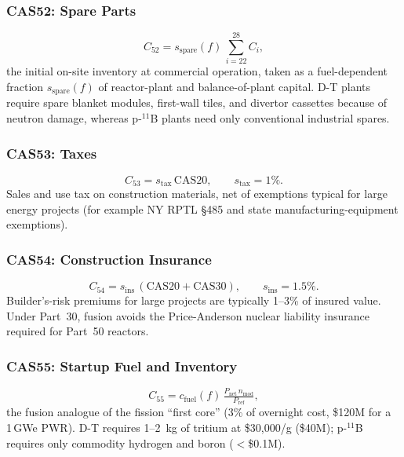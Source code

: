 \documentclass{article}
\begin{document}
\subsubsection{CAS52: Spare Parts}
\begin{equation}
\label{eq:cas52}
C_{52} = s_{\text{spare}}(f)\,\textstyle\sum_{i=22}^{28} C_i,
\end{equation}
the initial on-site inventory at commercial operation, taken as a
fuel-dependent fraction $s_{\text{spare}}(f)$ of reactor-plant and
balance-of-plant capital. D-T plants require spare blanket modules,
first-wall tiles, and divertor cassettes because of neutron damage,
whereas p-${}^{11}$B plants need only conventional industrial spares.

\subsubsection{CAS53: Taxes}
\begin{equation}
\label{eq:cas53}
C_{53} = s_{\text{tax}}\,\text{CAS20}, \qquad s_{\text{tax}} = 1\%.
\end{equation}
Sales and use tax on construction materials, net of exemptions typical
for large energy projects (for example NY RPTL \S485 and state
manufacturing-equipment exemptions).

\subsubsection{CAS54: Construction Insurance}
\begin{equation}
\label{eq:cas54}
C_{54} = s_{\text{ins}}\,(\text{CAS20}+\text{CAS30}), \qquad s_{\text{ins}} = 1.5\%.
\end{equation}
Builder's-risk premiums for large projects are typically 1--3\% of
insured value. Under Part~30, fusion avoids the Price-Anderson nuclear
liability insurance required for Part~50 reactors.

\subsubsection{CAS55: Startup Fuel and Inventory}
\begin{equation}
\label{eq:cas55}
C_{55} = c_{\text{fuel}}(f)\,\tfrac{P_{\text{net}}\,n_{\text{mod}}}{P_{\text{ref}}},
\end{equation}
the fusion analogue of the fission ``first core'' (3\% of overnight
cost, \$120M for a 1\,GWe PWR). D-T requires 1--2~kg of tritium at
\$30{,}000/g (\$40M); p-${}^{11}$B requires only commodity hydrogen and
boron ($<$\$0.1M).
\end{document}
